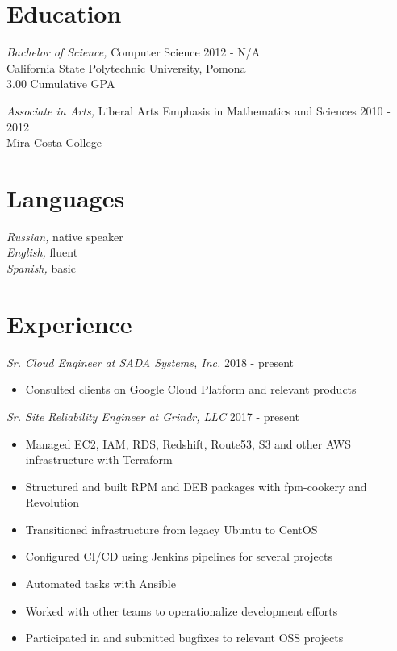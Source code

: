 \documentclass[line]{tex/res}
\begin{document}
\address{}
\address{Email: me@smaslennikov.com}

\begin{resume}

\section{Education}
\vspace{0.1in}
    {\sl Bachelor of Science,} Computer Science \hfill 2012 - N/A\\
    California State Polytechnic University, Pomona \\
    3.00 Cumulative GPA

    {\sl Associate in Arts,} Liberal Arts Emphasis in Mathematics and Sciences \hfill 2010 - 2012 \\
    Mira Costa College

\section{Languages}
    {\sl Russian,} native speaker \\
    {\sl English,} fluent \\
    {\sl Spanish,} basic

\section{Experience}
    {\sl Sr. Cloud Engineer at SADA Systems, Inc.} \hfill 2018 - present
    \begin{itemize} \itemsep -2pt
        \item Consulted clients on Google Cloud Platform and relevant products
    \end{itemize}

    {\sl Sr. Site Reliability Engineer at Grindr, LLC} \hfill 2017 - present
    \begin{itemize} \itemsep -2pt %
        \item Managed EC2, IAM, RDS, Redshift, Route53, S3 and other AWS infrastructure with Terraform
        \item Structured and built RPM and DEB packages with fpm-cookery and Revolution
        \item Transitioned infrastructure from legacy Ubuntu to CentOS
        \item Configured CI/CD using Jenkins pipelines for several projects
        \item Automated tasks with Ansible
        \item Worked with other teams to operationalize development efforts
        \item Participated in and submitted bugfixes to relevant OSS projects
    \end{itemize}


\end{resume}
\end{document}
